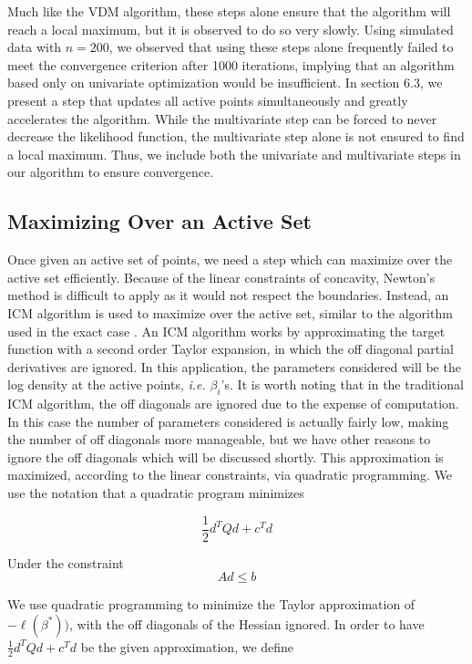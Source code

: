 	Much like the VDM algorithm, these steps alone ensure that the algorithm will reach a local maximum, but it is observed to do so very slowly. Using simulated data with $n = 200$, we observed that using these steps alone frequently failed to meet the convergence criterion after 1000 iterations, implying that an algorithm based only on univariate optimization would be insufficient. In section 6.3, we present a step that updates all active points simultaneously and greatly accelerates the algorithm. While the multivariate step can be forced to never decrease the likelihood function, the multivariate step alone is not ensured to find a local maximum. Thus, we include both the univariate and multivariate steps in our algorithm to ensure convergence. 
	\\
	
	{\subsection{Maximizing Over an Active Set} }
	
	
	Once given an active set of points, we need a step which can  maximize over the active set efficiently. Because of the linear constraints of concavity, Newton's method is difficult to apply as it would not respect the boundaries. Instead, an ICM \cite{RefJ1998} algorithm is used to maximize over the active set, similar to the algorithm used in the exact case \cite{RefDea2007}. An ICM algorithm works by approximating the target function with a second order Taylor expansion, in which the off diagonal partial derivatives are ignored. In this application, the parameters considered will be the log density at the active points, \emph{i.e.} $\beta_i$'s. It is worth noting that in the traditional ICM algorithm, the off diagonals are ignored due to the expense of computation. In this case the number of parameters considered  is actually fairly low, making the number of off diagonals more manageable, but we have other reasons to ignore the off diagonals which will be discussed shortly. This approximation is maximized, according to the linear constraints, via quadratic programming. We use the notation that a quadratic program minimizes
	
	\[ \frac{1}{2} d^T Q d + c^T d
	\]
	
	Under the constraint \[ A d \leq b\]
	
	We use quadratic programming to minimize the Taylor approximation of $-\ell(\beta^*))$, with the off diagonals of the Hessian ignored. In order to have $\frac{1}{2} d^T Q d + c^T d$ be the given approximation, we define
	
